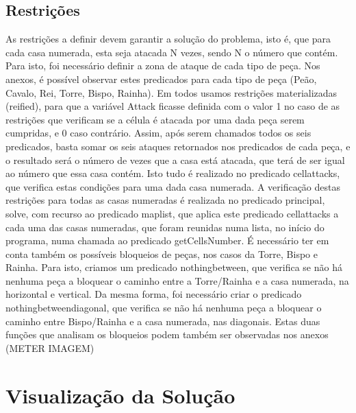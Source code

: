 \documentclass[runningheads]{llncs}
\begin{document}
\subsection{Restrições}
    As restrições a definir devem garantir a solução do problema, isto é, que para cada casa numerada, esta seja atacada N vezes, sendo N o número que contém. Para isto, foi necessário definir a zona de ataque de cada tipo de peça.
    Nos anexos, é possível observar estes predicados para cada tipo de peça (Peão, Cavalo, Rei, Torre, Bispo, Rainha). Em todos usamos restrições materializadas (reified), para que a variável Attack ficasse definida com o valor 1 no caso de as restrições que verificam se a célula é atacada por uma dada peça serem cumpridas, e 0 caso contrário.
    Assim, após serem chamados todos os seis predicados, basta somar os seis ataques retornados nos predicados de cada peça, e o resultado será o número de vezes que a casa está atacada, que terá de ser igual ao número que essa casa contém.
    Isto tudo é realizado no predicado cell\textunderscore attacks, que verifica estas condições para uma dada casa numerada. A verificação destas restrições para todas as casas numeradas é realizada no predicado principal, solve, com recurso ao predicado maplist, que aplica este predicado cell\textunderscore attacks a cada uma das casas numeradas, que foram reunidas numa lista, no início do programa, numa chamada ao predicado getCellsNumber.
    É necessário ter em conta também os possíveis bloqueios de peças, nos casos da Torre, Bispo e Rainha. Para isto, criamos um predicado nothing\textunderscore between, que verifica se não há nenhuma peça a bloquear o caminho entre a Torre/Rainha e a casa numerada, na horizontal e vertical.
    Da mesma forma, foi necessário criar o predicado nothing\textunderscore between\textunderscore diagonal, que verifica se não há nenhuma peça a bloquear o caminho entre Bispo/Rainha e a casa numerada, nas diagonais.
    Estas duas funções que analisam os bloqueios podem também ser observadas nos anexos (METER IMAGEM)

\section{Visualização da Solução}
\end{document}
